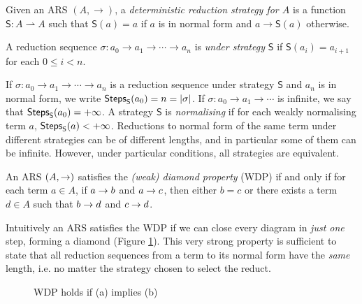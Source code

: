 \begin{definition}\label{def:determstrat}
	Given an ARS $(A,\rightarrow)$, a \emph{deterministic reduction
		strategy for $A$} is a function $\mathsf{S}:A\rightharpoonup A$
	such that $\mathsf{S}(a)=a$ if $a$ is in
	normal form and $a\rightarrow\mathsf{S}(a)$ otherwise.
\end{definition}
\begin{definition}
	A reduction sequence $\sigma:a_0\rightarrow a_1\rightarrow\cdots\rightarrow a_n$ is \emph{under strategy} $\mathsf{S}$ if $\mathsf{S}(a_i)=a_{i+1}$ for each $0\leq i<n$.
\end{definition}
If $\sigma:a_0\rightarrow a_1\rightarrow\cdots\rightarrow a_n$ is a
reduction sequence under strategy $\mathsf{S}$ and $a_n$ is in normal
form, we write $\textsf{Steps}_{\mathsf{S}}(a_0)=n=|\sigma|$. If
$\sigma:a_0\rightarrow a_1\rightarrow\cdots$ is infinite, we say that
$\textsf{Steps}_{\mathsf{S}}(a_0)=+\infty$. A strategy $\mathsf{S}$ is \emph{normalising} if for each weakly normalising term $a$, $\textsf{Steps}_{\mathsf{S}}(a)<+\infty$. Reductions to normal form of the same term under different strategies can be of different lengths, and in particular some of them can be infinite. However, under particular conditions, all strategies are equivalent.
\begin{definition}
	An ARS $(A,\rightarrow)$ satisfies the \emph{(weak) diamond property} (WDP) if and only if for each term $a\in A$, if $a\rightarrow b$ and $a\rightarrow c$, then either $b=c$ or there exists a term $d\in A$ such that $b\rightarrow d$ and $c\rightarrow d$. 
\end{definition}
Intuitively an ARS satisfies the WDP if we can close every diagram in \emph{just one} step, forming a diamond (Figure \ref{figure:diam}). This very strong property is sufficient to state that all reduction sequences from a term to its normal form have the \emph{same} length, i.e. no matter the strategy chosen to select the reduct.
\begin{figure}
	\centering
	\qquad
	\caption{WDP holds if (a) implies (b)}
	\label{figure:diam}
\end{figure}
